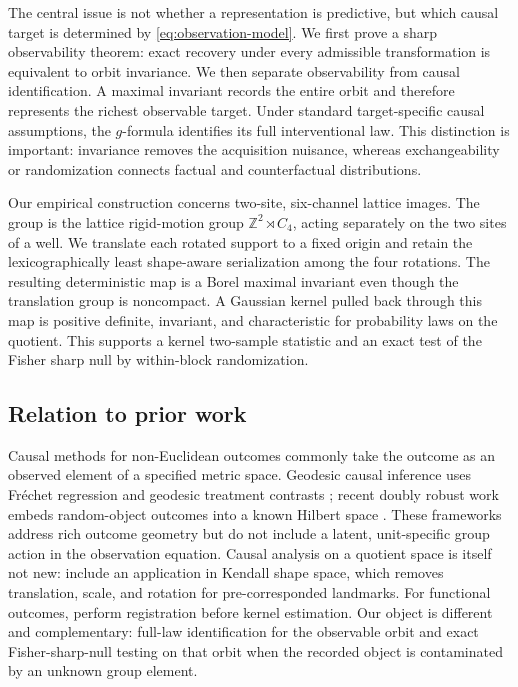 \documentclass[11pt]{article}
\theoremstyle{definition}
\theoremstyle{remark}
\newcommand{\bZ}{\mathbb Z}
\newcommand{\1}{\mathbf 1}
\begin{document}
The central issue is not whether a representation is predictive, but which
causal target is determined by \eqref{eq:observation-model}.  We first prove a
sharp observability theorem: exact recovery under every admissible
transformation is equivalent to orbit invariance.  We then separate
observability from causal identification.  A maximal invariant records the
entire orbit and therefore represents the richest observable target.  Under
standard target-specific causal assumptions, the \(g\)-formula identifies its
full interventional law.  This distinction is important: invariance removes the
acquisition nuisance, whereas exchangeability or randomization connects factual
and counterfactual distributions.

Our empirical construction concerns two-site, six-channel lattice images.  The
group is the lattice rigid-motion group
\(\bZ^2\rtimes C_4\), acting separately on the two sites of a well.  We
translate each rotated support to a fixed origin and retain the
lexicographically least shape-aware serialization among the four rotations.
The resulting deterministic map is a Borel maximal invariant even though the
translation group is noncompact.  A Gaussian kernel pulled back through this
map is positive definite, invariant, and characteristic for probability laws
on the quotient.  This supports a kernel two-sample statistic and an exact test
of the Fisher sharp null by within-block randomization.

\subsection{Relation to prior work}

Causal methods for non-Euclidean outcomes commonly take the outcome as an
observed element of a specified metric space.  Geodesic causal inference uses
Fr\'echet regression and geodesic treatment contrasts
\citep{kurisu2024geodesic}; recent doubly robust work embeds random-object
outcomes into a known Hilbert space \citep{bhattacharjee2025doubly}.  These
frameworks address rich outcome geometry but do not include a latent,
unit-specific group action in the observation equation.  Causal analysis on a
quotient space is itself not new: \citet{shin2024absolute} include an
application in Kendall shape space, which removes translation, scale, and
rotation for pre-corresponded landmarks.  For functional outcomes,
\citet{raykov2025kernel} perform registration before kernel estimation.  Our
object is different and complementary: full-law identification for the
observable orbit and exact Fisher-sharp-null testing on that orbit when the
recorded object is contaminated by an unknown group element.
\end{document}
